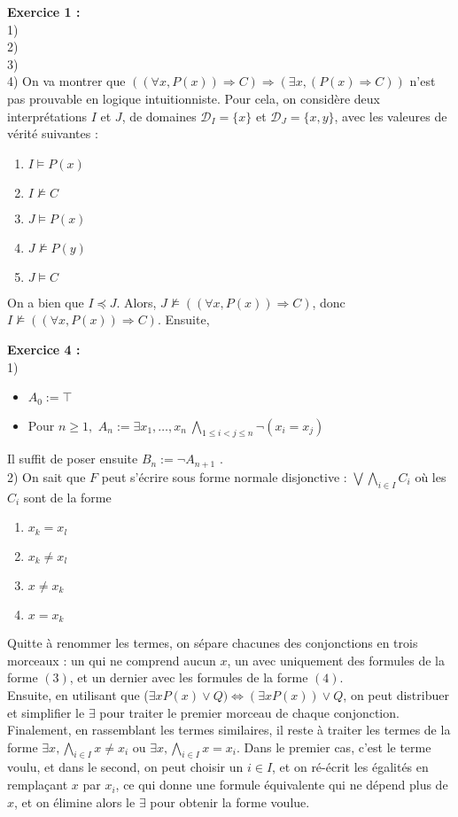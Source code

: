 \documentclass[11pt,a4paper]{article}
\begin{document}
\textbf{Exercice 1 :}\\
1) \\
2) \\
3) \\
4) On va montrer que $((\forall x, P(x))\Rightarrow C) \Rightarrow (\exists x, (P(x) \Rightarrow C)) $ n'est pas prouvable en logique intuitionniste. Pour cela, on considère deux interprétations $I$ et $J$, de domaines $\mathcal{D}_I = \{x\}$ et $\mathcal{D}_J =\{x,y\}$, avec les valeures de vérité suivantes :
\begin{enumerate}
\item $I \models P(x)$
\item $I \not\models C$
\item $J \models P(x)$
\item $J \not\models P(y)$
\item $J \models C$
\end{enumerate} 
On a bien que $I \preceq J$. Alors, $J \not\models ((\forall x, P(x))\Rightarrow C)$, donc $I \not\models ((\forall x, P(x))\Rightarrow C)$. Ensuite, 

\textbf{Exercice 4 :} \\

1) \begin{itemize}
\item $A_0:=\top$
\item Pour $n \geq 1, $ $\displaystyle A_n := \exists x_1,\dots,x_n \ \bigwedge_{1\leq i<j \leq n}\lnot(x_i=x_j)$
\end{itemize} 
Il suffit de poser ensuite $B_n := \lnot A_{n+1}$ . \\

2) On sait que $F$ peut s'écrire sous forme normale disjonctive : $\displaystyle \bigvee \bigwedge_{i \in I} C_i $ où les $C_i$ sont de la forme 
\begin{enumerate}
\item $x_k=x_l$
\item $x_k\neq x_l$
\item $x\neq x_k$
\item $x=x_k$
\end{enumerate}
Quitte à renommer les termes, on sépare chacunes des conjonctions en trois morceaux : un qui ne comprend aucun $x$, un avec uniquement des formules de la forme $(3)$, et un dernier avec les formules de la forme $(4)$. \\ 
Ensuite, en utilisant que ($\exists x P(x) \lor Q) \Leftrightarrow (\exists x P(x))\lor Q$, on peut distribuer et simplifier le $\exists$ pour traiter le premier morceau de chaque conjonction. \\
 Finalement, en rassemblant les termes similaires,  il reste à traiter les termes de la forme $\exists x, \bigwedge_{i \in I} x\neq x_i$ ou $\exists x, \bigwedge_{i \in I} x= x_i$. Dans le premier cas, c'est le terme voulu, et dans le second, on peut choisir un $i\in I$, et on ré-écrit les égalités en remplaçant $x$ par $x_i$, ce qui donne une formule équivalente qui ne dépend plus de $x$, et on élimine alors le $\exists$ pour obtenir la forme voulue. \\
 
\end{document}
